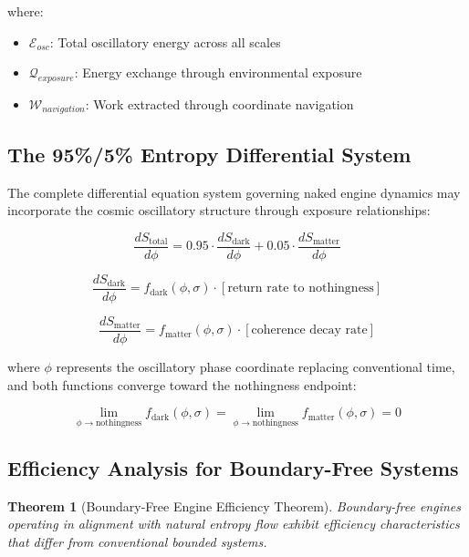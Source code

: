 \documentclass[11pt,a4paper]{article}
\newtheorem{theorem}{Theorem}[section]
\theoremstyle{remark}
\begin{document}
where:
\begin{itemize}
\item $\mathcal{E}_{osc}$: Total oscillatory energy across all scales
\item $\mathcal{Q}_{exposure}$: Energy exchange through environmental exposure
\item $\mathcal{W}_{navigation}$: Work extracted through coordinate navigation
\end{itemize}

\subsection{The 95\%/5\% Entropy Differential System}

The complete differential equation system governing naked engine dynamics may incorporate the cosmic oscillatory structure through exposure relationships:

\begin{equation}
\frac{dS_{\text{total}}}{d\phi} = 0.95 \cdot \frac{dS_{\text{dark}}}{d\phi} + 0.05 \cdot \frac{dS_{\text{matter}}}{d\phi}
\label{eq:cosmic_entropy}
\end{equation}

\begin{equation}
\frac{dS_{\text{dark}}}{d\phi} = f_{\text{dark}}(\phi, \sigma) \cdot [\text{return rate to nothingness}]
\label{eq:dark_entropy}
\end{equation}

\begin{equation}
\frac{dS_{\text{matter}}}{d\phi} = f_{\text{matter}}(\phi, \sigma) \cdot [\text{coherence decay rate}]
\label{eq:matter_entropy}
\end{equation}

where $\phi$ represents the oscillatory phase coordinate replacing conventional time, and both functions converge toward the nothingness endpoint:

\begin{equation}
\lim_{\phi \to \text{nothingness}} f_{\text{dark}}(\phi, \sigma) = \lim_{\phi \to \text{nothingness}} f_{\text{matter}}(\phi, \sigma) = 0
\end{equation}

\subsection{Efficiency Analysis for Boundary-Free Systems}

\begin{theorem}[Boundary-Free Engine Efficiency Theorem]
Boundary-free engines operating in alignment with natural entropy flow exhibit efficiency characteristics that differ from conventional bounded systems.
\end{theorem}
\end{document}
